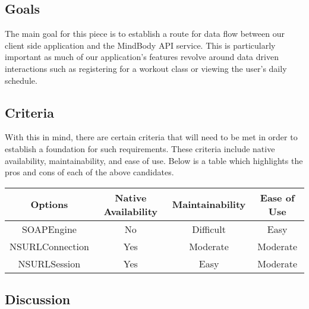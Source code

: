 \documentclass[letterpaper,10pt,titlepage]{article}
\begin{document}
\subsection{Goals}

The main goal for this piece is to establish a route for data flow between our client side application and the MindBody API service. This is particularly important as much of our application's features revolve around data driven interactions such as registering for a workout class or viewing the user's daily schedule.\\

\subsection{Criteria}

With this in mind, there are certain criteria that will need to be met in order to establish a foundation for such requirements. These criteria include native availability, maintainability, and ease of use. Below is a table which highlights the pros and cons of each of the above candidates.\\

\begin{center}
\begin{tabular}{ |c|c|c|c| }
 \hline
 Options & Native Availability & Maintainability & Ease of Use \\ \hline
 SOAPEngine & No & Difficult & Easy \\ \hline
 NSURLConnection & Yes & Moderate & Moderate \\ \hline
 NSURLSession & Yes & Easy & Moderate \\
 \hline
\end{tabular}
\end{center}

\subsection{Discussion}
\end{document}

